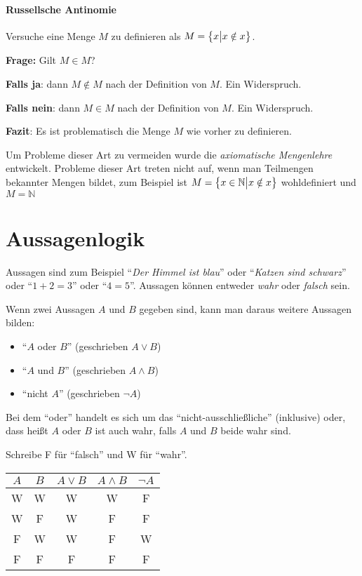 \documentclass{scrreprt}
\begin{document}
\paragraph{Russellsche Antinomie} Versuche eine Menge $M$ zu definieren als
$M = \qty\big{x {\big |} x \notin x}$.

\textbf{Frage:} Gilt $M \in M$?

\textbf{Falls ja}: dann $M \notin M$ nach der Definition von $M$.
Ein Widerspruch.

\textbf{Falls nein}: dann $M \in M$ nach der Definition von $M$.
Ein Widerspruch.

\textbf{Fazit}: Es ist problematisch die Menge $M$ wie vorher zu definieren.

Um Probleme dieser Art zu vermeiden wurde die \emph{axiomatische Mengenlehre}
entwickelt.
Probleme dieser Art treten nicht auf, wenn man Teilmengen bekannter Mengen
bildet, zum Beispiel ist $M = \qty\big{x \in \mathbb{N} {\big |} x \notin x}$
wohldefiniert und $M = \mathbb{N}$

\section*{Aussagenlogik}

Aussagen sind zum Beispiel ``\emph{Der Himmel ist blau}'' oder
``\emph{Katzen sind schwarz}'' oder ``$1 + 2 = 3$'' oder
``$4 = 5$''.
Aussagen können entweder \emph{wahr} oder \emph{falsch} sein.

Wenn zwei Aussagen $A$ und $B$ gegeben sind, kann man daraus weitere Aussagen
bilden:
\begin{itemize}
\item ``$A$ oder $B$'' (geschrieben $A \lor B$)
\item ``$A$ und $B$'' (geschrieben $A \land B$)
\item ``nicht $A$'' (geschrieben $\neg A$)
\end{itemize}

Bei dem ``oder'' handelt es sich um das ``nicht-ausschließliche''
(inklusive) oder, dass heißt $A$ oder $B$ ist auch wahr, falls
$A$ und $B$ beide wahr sind.

\newpage
Schreibe F für ``falsch'' und W für ``wahr''.
\begin{center}
  \begin{tabular}{c | c | c | c | c}
    $A$ & $B$ & $A \lor B$ & $A \land B$ & $\neg A$ \\
    \hline
    W & W & W & W & F \\
    W & F & W & F & F \\
    F & W & W & F & W \\
    F & F & F & F & F
  \end{tabular}
\end{center}
\end{document}
